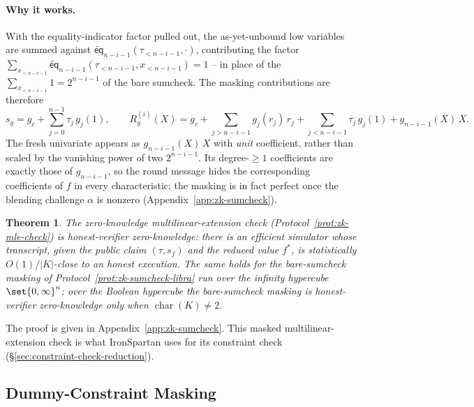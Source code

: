 \documentclass{article}
\newtheorem{theorem}{Theorem}[section]
\theoremstyle{definition}
\newcommand*{\mle}{\widetilde}
\newcommand{\eq}{\mathsf{eq}}
\begin{document}
\paragraph{Why it works.}
With the equality-indicator factor pulled out, the as-yet-unbound low variables are summed against $\mle{\eq}_{n - i - 1}(\tau_{< n - i - 1}, \cdot)$, contributing the factor $\sum_{x_{< n - i - 1}} \mle{\eq}_{n - i - 1}(\tau_{< n - i - 1}, x_{< n - i - 1}) = 1$ -- in place of the $\sum_{x_{< n - i - 1}} 1 = 2^{n - i - 1}$ of the bare sumcheck. The masking contributions are therefore
\[
  s_g = g_c + \sum_{j = 0}^{n - 1} \tau_j\, g_j(1), \qquad R_g^{(i)}(X) = g_c + \sum_{j > n - i - 1} g_j(r_j)\, r_j + \sum_{j < n - i - 1} \tau_j\, g_j(1) + g_{n - i - 1}(X)\, X.
\]
The fresh univariate appears as $g_{n - i - 1}(X)\, X$ with \emph{unit} coefficient, rather than scaled by the vanishing power of two $2^{n - i - 1}$. Its degree-$\ge 1$ coefficients are exactly those of $g_{n - i - 1}$, so the round message hides the corresponding coefficients of $f$ in every characteristic; the masking is in fact perfect once the blending challenge $\alpha$ is nonzero (Appendix~\ref{app:zk-sumcheck}).

\begin{theorem}
\label{thm:zk-mle-check}
The zero-knowledge multilinear-extension check (Protocol~\ref{prot:zk-mle-check}) is honest-verifier zero-knowledge: there is an efficient simulator whose transcript, given the public claim $(\tau, s_f)$ and the reduced value $f^*$, is statistically $O(1)/|K|$-close to an honest execution. The same holds for the bare-sumcheck masking of Protocol~\ref{prot:zk-sumcheck-libra} run over the infinity hypercube $\set{0, \infty}^n$; over the Boolean hypercube the bare-sumcheck masking is honest-verifier zero-knowledge only when $\operatorname{char}(K) \neq 2$.
\end{theorem}

The proof is given in Appendix~\ref{app:zk-sumcheck}. This masked multilinear-extension check is what IronSpartan uses for its constraint check (\S\ref{sec:constraint-check-reduction}).

\subsection{Dummy-Constraint Masking}
\label{sec:dummy-masking}
\end{document}
